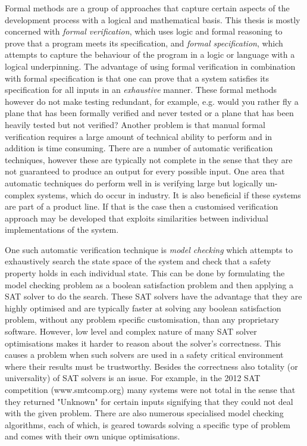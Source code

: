 Formal methods are a group of approaches that capture certain aspects of the development process with a logical and mathematical basis. This thesis is mostly concerned with \emph{formal verification}, which uses logic and formal reasoning to prove that a program meets its specification, and \emph{formal specification}, which attempts to capture the behaviour of the program in a logic or language with a logical underpinning. The advantage of using formal verification in combination with formal specification is that one can prove that a system satisfies its specification for all inputs in an \emph{exhaustive} manner. These formal methods however do not make testing redundant, for example, e.g. would you rather fly a plane that has been formally verified and never tested or a plane that has been heavily tested but not verified? Another problem is that manual formal verification requires a large amount of technical ability to perform and in addition is time consuming. There are a number of automatic verification techniques, however these are typically not complete in the sense that they are not guaranteed to produce an output for every possible input. One area that automatic techniques do perform well in is verifying large but logically un-complex systems, which do occur in industry. It is also beneficial if these systems are part of a product line. If that is the case then a customised verification approach may be developed that exploits similarities between individual implementations of the system.

One such automatic verification technique is \emph{model checking} which attempts to exhaustively search the state space of the system and check that a safety property holds in each individual state. This can be done by formulating the model checking problem as a boolean satisfaction problem and then applying a SAT solver to do the search. These SAT solvers have the advantage that they are highly optimised and are typically faster at solving any boolean satisfaction problem, without any problem specific customisation, than any proprietary software. However, low level and complex nature of many SAT solver optimisations makes it harder to reason about the solver's correctness. This causes a problem when such solvers are used in a safety critical environment where their results must be trustworthy. Besides the correctness also
totality (or universality) of SAT solvers is an issue. For example, in the 2012 SAT competition (www.smtcomp.org) many systems were not total in the sense that they returned
"Unknown" for certain inputs signifying that they could not deal with the given problem.  There are also numerous specialised model checking algorithms, each of which, is geared towards solving a specific type of problem and comes with their own unique optimisations.


